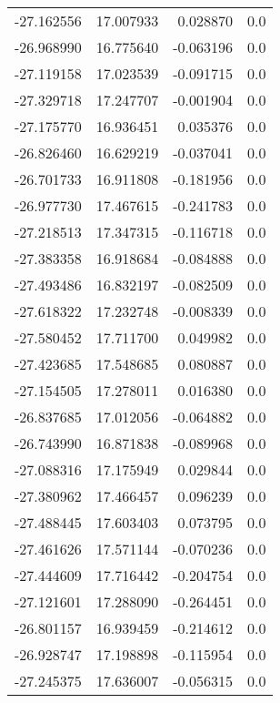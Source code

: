 \begin{tabular}{rrrr}
      -27.162556 &        17.007933 &    0.028870 &   0.0 \\
      -26.968990 &        16.775640 &   -0.063196 &   0.0 \\
      -27.119158 &        17.023539 &   -0.091715 &   0.0 \\
      -27.329718 &        17.247707 &   -0.001904 &   0.0 \\
      -27.175770 &        16.936451 &    0.035376 &   0.0 \\
      -26.826460 &        16.629219 &   -0.037041 &   0.0 \\
      -26.701733 &        16.911808 &   -0.181956 &   0.0 \\
      -26.977730 &        17.467615 &   -0.241783 &   0.0 \\
      -27.218513 &        17.347315 &   -0.116718 &   0.0 \\
      -27.383358 &        16.918684 &   -0.084888 &   0.0 \\
      -27.493486 &        16.832197 &   -0.082509 &   0.0 \\
      -27.618322 &        17.232748 &   -0.008339 &   0.0 \\
      -27.580452 &        17.711700 &    0.049982 &   0.0 \\
      -27.423685 &        17.548685 &    0.080887 &   0.0 \\
      -27.154505 &        17.278011 &    0.016380 &   0.0 \\
      -26.837685 &        17.012056 &   -0.064882 &   0.0 \\
      -26.743990 &        16.871838 &   -0.089968 &   0.0 \\
      -27.088316 &        17.175949 &    0.029844 &   0.0 \\
      -27.380962 &        17.466457 &    0.096239 &   0.0 \\
      -27.488445 &        17.603403 &    0.073795 &   0.0 \\
      -27.461626 &        17.571144 &   -0.070236 &   0.0 \\
      -27.444609 &        17.716442 &   -0.204754 &   0.0 \\
      -27.121601 &        17.288090 &   -0.264451 &   0.0 \\
      -26.801157 &        16.939459 &   -0.214612 &   0.0 \\
      -26.928747 &        17.198898 &   -0.115954 &   0.0 \\
      -27.245375 &        17.636007 &   -0.056315 &   0.0 \\

\end{tabular}
